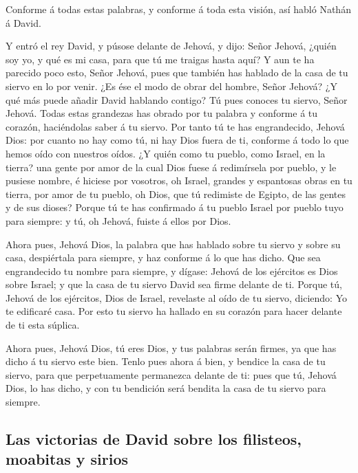  Conforme á todas estas palabras, y conforme á toda esta
visión, así habló Nathán á David.

 Y entró el rey David, y púsose delante de Jehová, y dijo:
Señor Jehová, ¿quién soy yo, y qué es mi casa, para que tú me traigas
hasta aquí?  Y aun te ha parecido poco esto, Señor Jehová,
pues que también has hablado de la casa de tu siervo en lo por venir.
¿Es ése el modo de obrar del hombre, Señor Jehová?  ¿Y qué
más puede añadir David hablando contigo? Tú pues conoces tu siervo,
Señor Jehová.  Todas estas grandezas has obrado por tu
palabra y conforme á tu corazón, haciéndolas saber á tu siervo.
 Por tanto tú te has engrandecido, Jehová Dios: por cuanto
no hay como tú, ni hay Dios fuera de ti, conforme á todo lo que hemos
oído con nuestros oídos.  ¿Y quién como tu pueblo, como
Israel, en la tierra? una gente por amor de la cual Dios fuese á
redimírsela por pueblo, y le pusiese nombre, é hiciese por vosotros, oh
Israel, grandes y espantosas obras en tu tierra, por amor de tu pueblo,
oh Dios, que tú redimiste de Egipto, de las gentes y de sus dioses?
 Porque tú te has confirmado á tu pueblo Israel por pueblo
tuyo para siempre: y tú, oh Jehová, fuiste á ellos por Dios.

 Ahora pues, Jehová Dios, la palabra que has hablado sobre
tu siervo y sobre su casa, despiértala para siempre, y haz conforme á lo
que has dicho.  Que sea engrandecido tu nombre para
siempre, y dígase: Jehová de los ejércitos es Dios sobre Israel; y que
la casa de tu siervo David sea firme delante de ti.  Porque
tú, Jehová de los ejércitos, Dios de Israel, revelaste al oído de tu
siervo, diciendo: Yo te edificaré casa. Por esto tu siervo ha hallado en
su corazón para hacer delante de ti esta súplica.

 Ahora pues, Jehová Dios, tú eres Dios, y tus palabras
serán firmes, ya que has dicho á tu siervo este bien. 
Tenlo pues ahora á bien, y bendice la casa de tu siervo, para que
perpetuamente permanezca delante de ti: pues que tú, Jehová Dios, lo has
dicho, y con tu bendición será bendita la casa de tu siervo para
siempre.

\hypertarget{las-victorias-de-david-sobre-los-filisteos-moabitas-y-sirios}{%
\subsection{Las victorias de David sobre los filisteos, moabitas y
sirios}\label{las-victorias-de-david-sobre-los-filisteos-moabitas-y-sirios}}

